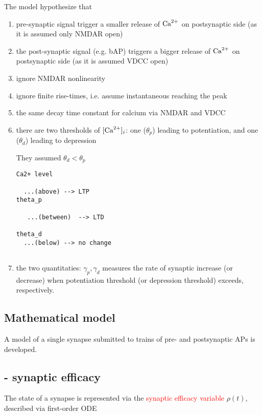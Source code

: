The model hypothesize that 
\begin{enumerate}
  \item pre-synaptic signal trigger a smaller release of ${\text{Ca}^{2+}}$ on postsynaptic
  side (as it is assumed only NMDAR open)
  
  \item the post-synaptic signal (e.g. bAP) triggers a bigger release of ${\text{Ca}^{2+}}$
  on postsynaptic side (as it is assumed VDCC open)
  
  \item ignore NMDAR nonlinearity
  \item ignore finite rise-times, i.e. assume instantaneous reaching the peak
  \item the same decay time constant for calcium via NMDAR and VDCC
  
  \item there are two thresholds of $[{\text{Ca}^{2+}}]_i$: one ($\theta_p$) leading to
  potentiation, and one ($\theta_d$) leading to depression
  
They assumed $ \theta_d < \theta_p$
\begin{verbatim}
Ca2+ level

  ...(above) --> LTP
theta_p

   ...(between)  --> LTD

theta_d
  ...(below) --> no change
  
\end{verbatim}

  \item the two quantitaties: $\gamma_p, \gamma_d$ measures the rate of synaptic
  increase (or decrease)  when potentiation threshold (or depression threshold)
  exceeds, respectively.
  
  
\end{enumerate}


\subsection{Mathematical model}

A model of a single synapse submitted to trains of pre- and postsynaptic APs
is developed. 

\subsection{- synaptic efficacy}

The state of a synapse is represented via the \textcolor{red}{synaptic efficacy
variable} $\rho(t)$, described via first-order ODE

